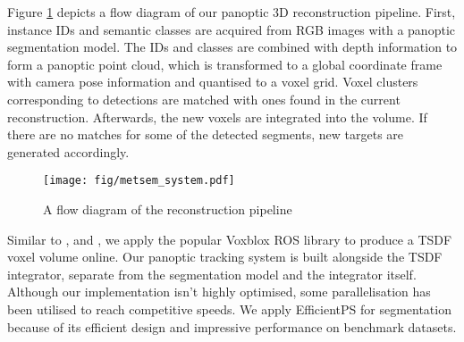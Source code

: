 
Figure \ref{fig:methods_intro_diagram} depicts a flow diagram of our panoptic 3D reconstruction pipeline. First, instance IDs and semantic classes are acquired from RGB images with a panoptic segmentation model. The IDs and classes are combined with depth information to form a panoptic point cloud, which is transformed to a global coordinate frame with camera pose information and quantised to a voxel grid. Voxel clusters corresponding to detections are matched with ones found in the current reconstruction. Afterwards, the new voxels are integrated into the volume. If there are no matches for some of the detected segments, new targets are generated accordingly.

\begin{figure}[t]

    \centering
    \texttt{[image: fig/metsem\_system.pdf]}
    \caption[]{A flow diagram of the reconstruction pipeline}
\label{fig:methods_intro_diagram}
\end{figure}

Similar to \cite{panopticfusion}, \cite{voxblox++} and \cite{interactive_3d_scenes}, we apply the popular Voxblox ROS library \cite{voxblox} to produce a TSDF voxel volume online. Our panoptic tracking system is built alongside the TSDF integrator, separate from the segmentation model and the integrator itself. Although our implementation isn't highly optimised, some parallelisation has been utilised to reach competitive speeds. We apply EfficientPS \cite{efficientps} for segmentation because of its efficient design and impressive performance on benchmark datasets.
